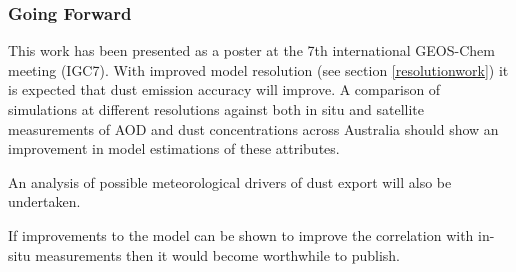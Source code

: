 \subsubsection{Going Forward}

This work has been presented as a poster at the 7th international GEOS-Chem meeting (IGC7).
With improved model resolution (see section \ref{resolutionwork}) it is expected that dust emission accuracy will improve.
A comparison of simulations at different resolutions against both in situ and satellite measurements of AOD and dust concentrations across Australia should show an improvement in model estimations of these attributes.

An analysis of possible meteorological drivers of dust export will also be undertaken.

If improvements to the model can be shown to improve the correlation with in-situ measurements then it would become worthwhile to publish.